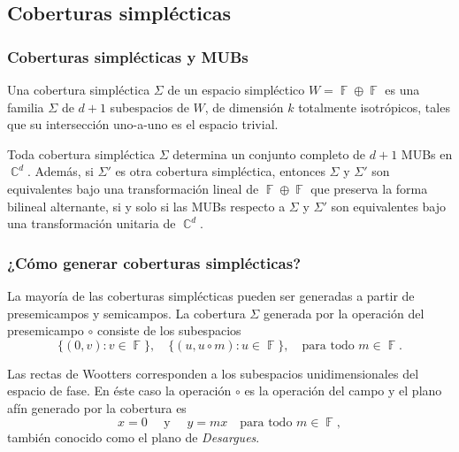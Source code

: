 \documentclass[10pt,spanish]{beamer}
\DeclareMathOperator{\C}{\mathbb{C}}
\DeclareMathOperator{\F}{\mathbb{F}}
\begin{document}
  

  \subsection{Coberturas simplécticas}

  \begin{frame}
    \frametitle{Coberturas simplécticas y MUBs}

    \begin{definition}
      Una cobertura simpléctica $\Sigma$ de un espacio
      simpléctico $W = \F \oplus \F$ es una familia $\Sigma$ 
      de $d+1$ subespacios de $W$, de dimensión $k$ 
      totalmente isotrópicos, tales que su intersección
      uno-a-uno es el espacio trivial.
    \end{definition}

    \pause

    \begin{theorem}[Kantor, 2.3]
      Toda cobertura simpléctica $\Sigma$ determina un
      conjunto completo de $d+1$ MUBs en $\C^{d}$. Además,
      si $\Sigma'$ es otra cobertura simpléctica, entonces
      $\Sigma$ y $\Sigma'$ son equivalentes bajo una
      transformación lineal de $\F \oplus \F$ que preserva
      la forma bilineal alternante, si y solo si las MUBs
      respecto a $\Sigma$ y $\Sigma'$ son equivalentes bajo
      una transformación unitaria de $\C^{d}$.
    \end{theorem}
  \end{frame}

  \begin{frame}
    \frametitle{¿Cómo generar coberturas simplécticas?}

    La mayoría de las coberturas simplécticas pueden ser
    generadas a partir de presemicampos y semicampos. La
    cobertura $\Sigma$ generada por la operación del
    presemicampo $\circ$ consiste de los subespacios 
    \begin{equation}
      \{(0,v) : v \in \F\},
      \quad
      \{(u,u\circ m) : u \in \F\},
      \quad \text{para todo } m \in \F.
    \end{equation}

    \vspace{5pt}

    \pause

    \begin{example}
      Las rectas de Wootters corresponden a los subespacios
      unidimensionales del espacio de fase. En éste caso la
      operación $\circ$ es la operación del campo y el plano
      afín generado por la cobertura es
      \begin{equation}
        x = 0
        \quad
        \text{ y }
        \quad
        y = mx
        \quad \text{para todo } m \in \F,
      \end{equation}
      también conocido como el plano de \textit{Desargues}.
    \end{example}
  \end{frame}
\end{document}

